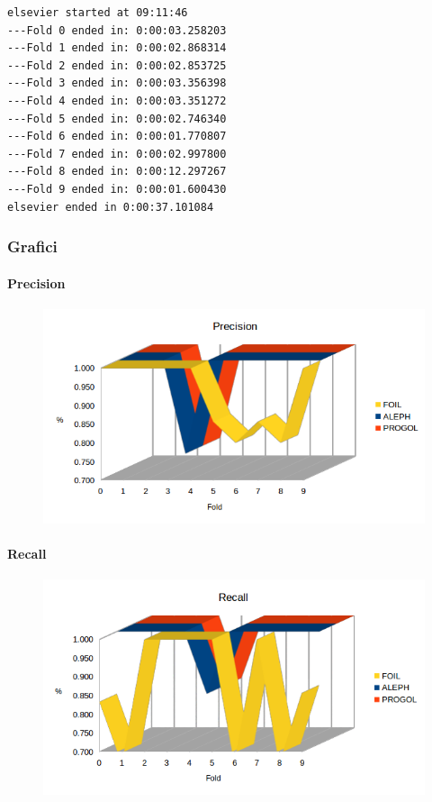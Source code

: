 \begin{verbatim}
elsevier started at 09:11:46
---Fold 0 ended in: 0:00:03.258203
---Fold 1 ended in: 0:00:02.868314
---Fold 2 ended in: 0:00:02.853725
---Fold 3 ended in: 0:00:03.356398
---Fold 4 ended in: 0:00:03.351272
---Fold 5 ended in: 0:00:02.746340
---Fold 6 ended in: 0:00:01.770807
---Fold 7 ended in: 0:00:02.997800
---Fold 8 ended in: 0:00:12.297267
---Fold 9 ended in: 0:00:01.600430
elsevier ended in 0:00:37.101084
\end{verbatim}
\subsubsection{Grafici}
\paragraph{Precision}
\begin{figure}[h!tbp]
	\includegraphics[width=1.2\textwidth]{img/datasetGraph/elsevier/precision.png}
	\label{Elsevier-Precision}
\end{figure}
\paragraph{Recall}
\begin{figure}[h!tbp]
	\includegraphics[width=1.2\textwidth]{img/datasetGraph/elsevier/recall.png}
	\label{Elsevier-Recall}
\end{figure}
